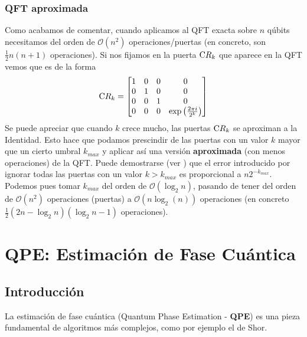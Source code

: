 \documentclass[a4paper,11pt]{book} %
\numberwithin{equation}{chapter}
\newcommand{\cg}[1]{{\rm C}#1}
\begin{document}
	\subsection{QFT aproximada}
	
Como acabamos de comentar, cuando aplicamos al QFT exacta sobre $n$ qúbits necesitamos del orden de $\mathcal{O} (n^2)$ operaciones/puertas (en concreto, son $\frac{1}{2} n(n+1)$ operaciones). Si nos fijamos en la puerta $\cg{R_k}$ que aparece en la QFT vemos que es de la forma
	\begin{equation}
	\cg{R_k} = \left[ \begin{matrix}
	1 & 0 & 0 & 0 \\
	0 & 1 & 0 & 0 \\
	0 & 0 & 1 & 0 \\
	0 & 0 & 0 & \exp \left( \frac{2 \pi i}{2^k} \right)
	\end{matrix} \right]
	\end{equation}
Se puede apreciar que cuando $k$ crece mucho, las puertas $\cg{R_k}$ se aproximan a la Identidad. Esto hace que podamos prescindir de las puertas con un valor $k$ mayor que un cierto umbral $k_{max}$ y aplicar así una versión \textbf{aproximada} (con menos operaciones) de la QFT. Puede demostrarse (ver \cite{bib_QFT-aprox}) que el error introducido por ignorar todas las puertas con un valor $k > k_{max}$ es proporcional a $n 2^{-k_{max}}$. Podemos pues tomar $k_{max}$ del orden de $\mathcal{O} (\log_2 n)$, pasando de tener del orden de $\mathcal{O} (n^2)$ operaciones (puertas) a $\mathcal{O} (n \log_2(n))$ operaciones (en concreto $\frac{1}{2} (2n-\log_2n)(\log_2n-1)$ operaciones).


\chapter{QPE: Estimación de Fase Cuántica} \label{sec_chapter_QPE}


\section{Introducción}

La estimación de fase cuántica (Quantum Phase Estimation - \textbf{QPE}) es una pieza fundamental de algoritmos más complejos, como por ejemplo el de Shor. 
\end{document}
